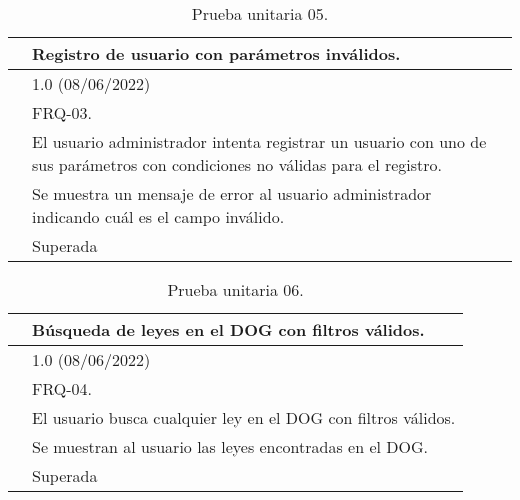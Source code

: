 \begin{table}[H]
\begin{center}
\begin{tabular}{|p{3cm}|p{10cm}|} \hline
\centering {\bf PU-05} & Registro de usuario con parámetros inválidos.  \\ \hline\hline
\centering {\bf Versión} & 1.0 (08/06/2022) \\ \hline
\centering {\bf Dependencias} & FRQ-03. \\ \hline
\centering {\bf Descripción} &  El usuario administrador intenta registrar un usuario con uno de sus parámetros con condiciones no válidas para el registro. \\ \hline
\centering {\bf Criterio de aceptación} & Se muestra un mensaje de error al usuario administrador indicando cuál es el campo inválido. \\ \hline
\centering {\bf Estado} & Superada \\ \hline
\end{tabular}
\caption{Prueba unitaria 05.}
\label{enlacePU5}
\end{center}
\end{table}

\begin{table}[H]
\begin{center}
\begin{tabular}{|p{3cm}|p{10cm}|} \hline
\centering {\bf PU-06} & Búsqueda de leyes en el DOG con filtros válidos.  \\ \hline\hline
\centering {\bf Versión} & 1.0 (08/06/2022) \\ \hline
\centering {\bf Dependencias} & FRQ-04. \\ \hline
\centering {\bf Descripción} &  El usuario busca cualquier ley en el DOG con filtros válidos. \\ \hline
\centering {\bf Criterio de aceptación} & Se muestran al usuario las leyes encontradas en el DOG. \\ \hline
\centering {\bf Estado} & Superada \\ \hline
\end{tabular}
\caption{Prueba unitaria 06.}
\label{enlacePU6}
\end{center}
\end{table}

